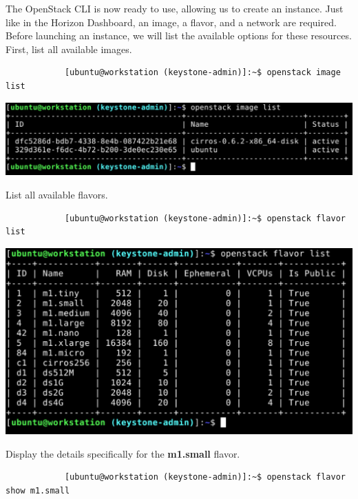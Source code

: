 \documentclass[letterpaper, 12pt]{article}
\begin{document}
\begin{enumerate}
    \begin{labstep}
        The OpenStack CLI is now ready to use, allowing us to create an instance.
        Just like in the Horizon Dashboard, an image, a flavor, and a network are required.
        Before launching an instance, we will list the available options for these resources.
        First, list all available images.
        \begin{lstlisting}
            [ubuntu@workstation (keystone-admin)]:~$ openstack image list
        \end{lstlisting}

        \begin{center}
            \includegraphics[width=\linewidth]{images/part2/step3.png}
        \end{center}
    \end{labstep}

    \begin{labstep}
        List all available flavors.
        \begin{lstlisting}
            [ubuntu@workstation (keystone-admin)]:~$ openstack flavor list
        \end{lstlisting}

        \begin{center}
            \includegraphics[width=\linewidth]{images/part2/step4.png}
        \end{center}
    \end{labstep}

    \begin{labstep}
        Display the details specifically for the \textbf{m1.small} flavor.
        \begin{lstlisting}
            [ubuntu@workstation (keystone-admin)]:~$ openstack flavor show m1.small
        \end{lstlisting}


\end{labstep}
\end{enumerate}
\end{document}
